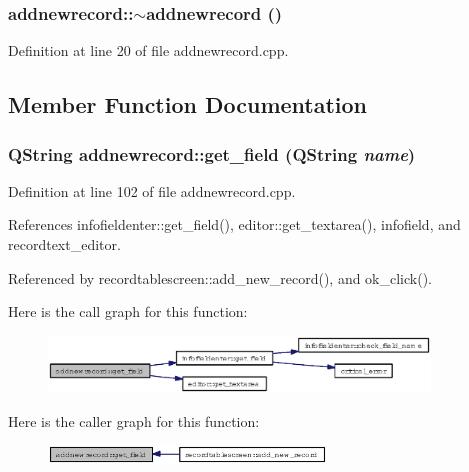 \subsubsection{\setlength{\rightskip}{0pt plus 5cm}addnewrecord::$\sim$addnewrecord ()}\label{classaddnewrecord_bf0eb3a43fdb46e529beb06212aaab06}




Definition at line 20 of file addnewrecord.cpp.

\subsection{Member Function Documentation}
\subsubsection{\setlength{\rightskip}{0pt plus 5cm}QString addnewrecord::get\_\-field (QString {\em name})}\label{classaddnewrecord_b17a7bac9ffb0b9474e0c5a50eecd958}




Definition at line 102 of file addnewrecord.cpp.

References infofieldenter::get\_\-field(), editor::get\_\-textarea(), infofield, and recordtext\_\-editor.

Referenced by recordtablescreen::add\_\-new\_\-record(), and ok\_\-click().

Here is the call graph for this function:\begin{figure}[H]
\begin{center}
\leavevmode
\includegraphics[width=287pt]{classaddnewrecord_b17a7bac9ffb0b9474e0c5a50eecd958_cgraph}
\end{center}
\end{figure}


Here is the caller graph for this function:\begin{figure}[H]
\begin{center}
\leavevmode
\includegraphics[width=209pt]{classaddnewrecord_b17a7bac9ffb0b9474e0c5a50eecd958_icgraph}
\end{center}
\end{figure}
